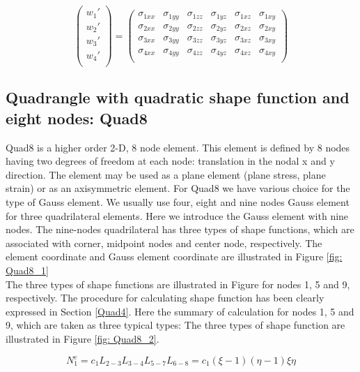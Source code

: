 \begin{equation}
\begin{pmatrix}
{w_1}' \\
{w_2}' \\
{w_3}' \\
{w_4}' \\
\end{pmatrix} = \begin{pmatrix}
\sigma_{1xx} & \sigma_{1yy} & \sigma_{1zz} & \sigma_{1yz} & \sigma_{1xz} & \sigma_{1xy}   \\
\sigma_{2xx} & \sigma_{2yy} & \sigma_{2zz} & \sigma_{2yz} & \sigma_{2xz} & \sigma_{2xy} \\
\sigma_{3xx} & \sigma_{3yy} & \sigma_{3zz} & \sigma_{3yz} & \sigma_{3xz} & \sigma_{3xy} \\
\sigma_{4xx} & \sigma_{4yy} & \sigma_{4zz} & \sigma_{4yz} & \sigma_{4xz} & \sigma_{4xy}  \\
\end{pmatrix}
\end{equation}

\subsection{Quadrangle with quadratic shape function and eight nodes: Quad8}
Quad8 is a higher order 2-D, 8 node element. This element is defined by 8 nodes having two degrees of freedom at each node: translation in the nodal x and y direction. The element may be used as a plane element (plane stress, plane strain) or as an axisymmetric element. For Quad8 we have various choice for the type of Gauss element.  We usually use four, eight and nine nodes Gauss element for three quadrilateral elements. Here we introduce the Gauss element with nine nodes. The nine-nodes quadrilateral has three types of shape functions, which are associated with corner, midpoint nodes and center node, respectively. The element coordinate and Gauss element coordinate are illustrated in Figure \ref{fig: Quad8_1} \\
The three types of shape functions are illustrated in Figure  for nodes 1, 5 and 9, respectively. The procedure for calculating shape function has been clearly expressed in Section \ref{Quad4}. Here the summary of calculation for nodes 1, 5 and 9, which are taken as three typical types: The three types of shape function are illustrated in Figure \ref{fig: Quad8_2}.

\begin{equation} \label{eq: Quad8_1}
N_1^e = c_1 L_{2-3}L_{3-4}L_{5-7} L_{6-8} = c_1 \left(\xi - 1\right) \left(\eta -1\right) \xi \eta
\end{equation}


